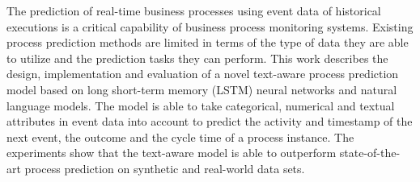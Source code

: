The prediction of real-time business processes using event data of historical executions is a critical capability of business process monitoring systems.
Existing process prediction methods are limited in terms of the type of data they are able to utilize and the prediction tasks they can perform.
This work describes the design, implementation and evaluation of a novel text-aware process prediction model based on long short-term memory (LSTM) neural networks and natural language models.
The model is able to take categorical, numerical and textual attributes in event data into account to predict the activity and timestamp of the next event, the outcome and the cycle time of a process instance.
The experiments show that the text-aware model is able to outperform state-of-the-art process prediction on synthetic and real-world data sets.